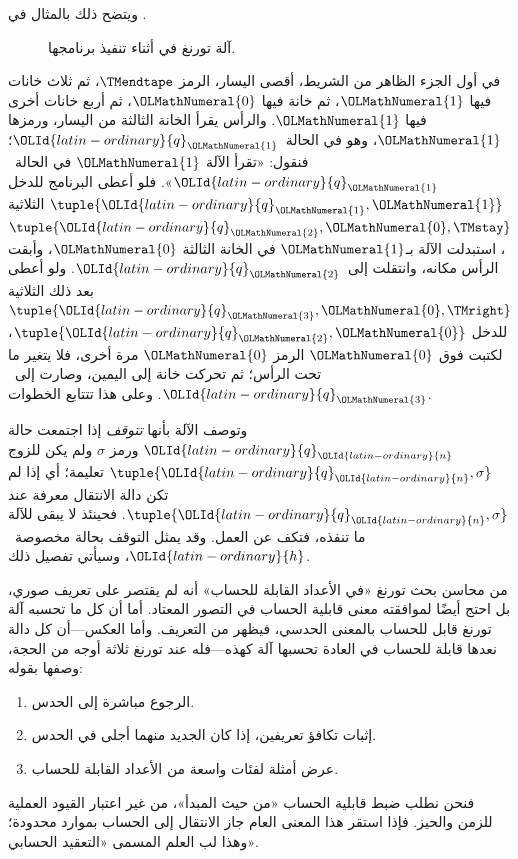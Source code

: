 \documentclass[../../../include/open-logic-section]{subfiles}
\begin{document}
\begin{explain}
ويتضح ذلك بالمثال في .
\begin{figure}
  \caption{آلة تورنغ في أثناء تنفيذ برنامجها.}
\end{figure}
في أول الجزء الظاهر من الشريط، أقصى اليسار، الرمز $\TMendtape$، ثم ثلاث خانات فيها $\OLMathNumeral{1}$، ثم خانة فيها $\OLMathNumeral{0}$، ثم أربع خانات أخرى فيها $\OLMathNumeral{1}$. والرأس يقرأ الخانة الثالثة من اليسار، ورمزها $\OLMathNumeral{1}$، وهو في الحالة~$\OLId{latin-ordinary}{q}_\OLMathNumeral{1}$؛ فنقول: «تقرأ الآلة $\OLMathNumeral{1}$ في الحالة~$\OLId{latin-ordinary}{q}_\OLMathNumeral{1}$». فلو أعطى البرنامج للدخل $\tuple{\OLId{latin-ordinary}{q}_\OLMathNumeral{1},\OLMathNumeral{1}}$ الثلاثية $\tuple{\OLId{latin-ordinary}{q}_\OLMathNumeral{2},\OLMathNumeral{0},\TMstay}$، استبدلت الآلة بـ$\OLMathNumeral{1}$ في الخانة الثالثة $\OLMathNumeral{0}$، وأبقت الرأس مكانه، وانتقلت إلى~$\OLId{latin-ordinary}{q}_\OLMathNumeral{2}$. ولو أعطى بعد ذلك الثلاثية $\tuple{\OLId{latin-ordinary}{q}_\OLMathNumeral{3},\OLMathNumeral{0},\TMright}$ للدخل $\tuple{\OLId{latin-ordinary}{q}_\OLMathNumeral{2},\OLMathNumeral{0}}$، لكتبت فوق $\OLMathNumeral{0}$ الرمز $\OLMathNumeral{0}$ مرة أخرى، فلا يتغير ما تحت الرأس؛ ثم تحركت خانة إلى اليمين، وصارت إلى~$\OLId{latin-ordinary}{q}_\OLMathNumeral{3}$. وعلى هذا تتتابع الخطوات.

وتوصف الآلة بأنها \emph{تتوقف} إذا اجتمعت حالة $\OLId{latin-ordinary}{q}_\OLId{latin-ordinary}{n}$ ورمز $\sigma$ ولم يكن للزوج $\tuple{\OLId{latin-ordinary}{q}_\OLId{latin-ordinary}{n},\sigma}$ تعليمة؛ أي إذا لم تكن دالة الانتقال معرفة عند $\tuple{\OLId{latin-ordinary}{q}_\OLId{latin-ordinary}{n},\sigma}$. فحينئذ لا يبقى للآلة ما تنفذه، فتكف عن العمل. وقد يمثل التوقف بحالة مخصوصة~$\OLId{latin-ordinary}{h}$، وسيأتي تفصيل ذلك.
\end{explain}

\begin{digress}
من محاسن بحث تورنغ «في الأعداد القابلة للحساب» أنه لم يقتصر على تعريف صوري، بل احتج أيضًا لموافقته معنى قابلية الحساب في التصور المعتاد. أما أن كل ما تحسبه آلة تورنغ قابل للحساب بالمعنى الحدسي، فيظهر من التعريف. وأما العكس---أن كل دالة نعدها قابلة للحساب في العادة تحسبها آلة كهذه---فله عند تورنغ ثلاثة أوجه من الحجة، وصفها بقوله:
\begin{enumerate}
\item الرجوع مباشرة إلى الحدس.
\item إثبات تكافؤ تعريفين، إذا كان الجديد منهما أجلى في الحدس.
\item عرض أمثلة لفئات واسعة من الأعداد القابلة للحساب.
\end{enumerate}
فنحن نطلب ضبط قابلية الحساب «من حيث المبدأ»، من غير اعتبار القيود العملية للزمن والحيز. فإذا استقر هذا المعنى العام جاز الانتقال إلى الحساب بموارد محدودة؛ وهذا لب العلم المسمى «التعقيد الحسابي».
\end{digress}
\end{document}
